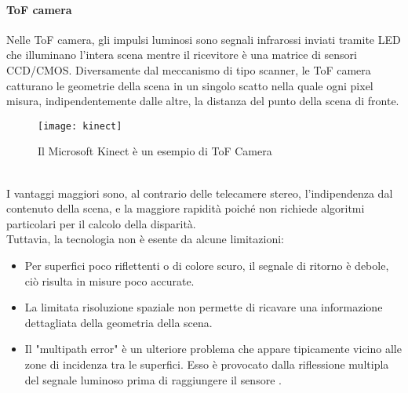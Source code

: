 \paragraph{ToF camera}
Nelle ToF camera, gli impulsi luminosi sono segnali infrarossi inviati tramite LED che illuminano l'intera scena mentre il ricevitore è una matrice di sensori CCD/CMOS. Diversamente dal meccanismo di tipo scanner, le ToF camera catturano le geometrie della scena in un singolo scatto nella quale ogni pixel misura, indipendentemente dalle altre, la distanza del punto della scena di fronte.
\begin{figure}[ht]
    \centering
    \texttt{[image: kinect]}
    \caption[Microsoft Kinect]{Il Microsoft Kinect è un esempio di ToF Camera}
\end{figure}\\
I vantaggi maggiori sono, al contrario delle telecamere stereo, l'indipendenza dal contenuto della scena, e la maggiore rapidità poiché non richiede algoritmi particolari per il calcolo della disparità. \\
Tuttavia, la tecnologia non è esente da alcune limitazioni: 
\begin{itemize}
    \item Per superfici poco riflettenti o di colore scuro, il segnale di ritorno è debole, ciò risulta in misure poco accurate. 
    \item La limitata risoluzione spaziale non permette di ricavare una informazione dettagliata della geometria della scena.
    \item Il "multipath error" è un ulteriore problema che appare tipicamente vicino alle zone di incidenza tra le superfici. Esso è provocato dalla riflessione multipla del segnale luminoso prima di raggiungere il sensore \cite{rif1}. 
\end{itemize}

